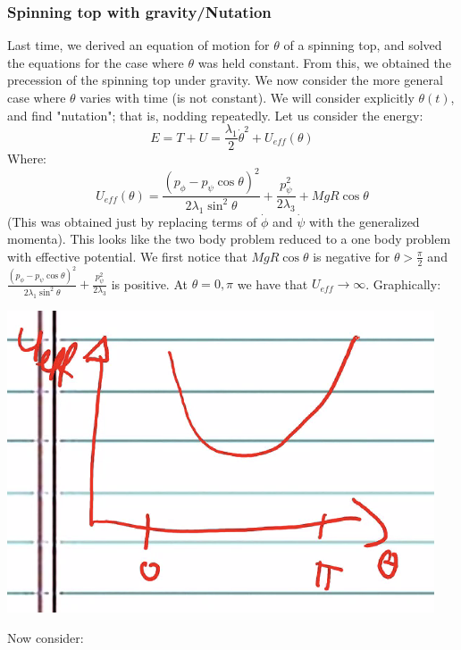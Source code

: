 \documentclass[../PHYS306Notes.tex]{subfiles}
\begin{document}
\subsubsection{Spinning top with gravity/Nutation}
Last time, we derived an equation of motion for $\theta$ of a spinning top, and solved the equations for the case where $\theta$ was held constant. From this, we obtained the precession of the spinning top under gravity. We now consider the more general case where $\theta$ varies with time (is not constant). We will consider explicitly $\theta(t)$, and find "nutation"; that is, nodding repeatedly. Let us consider the energy:
\[E = T + U = \frac{\lambda_1}{2}\dot{\theta}^2 + U_{eff}(\theta)\]
Where:
\[U_{eff}(\theta) = \frac{(p_\phi - p_\psi\cos\theta)^2}{2\lambda_1\sin^2\theta} + \frac{p_\psi^2}{2\lambda_3} + MgR\cos\theta\]
(This was obtained just by replacing terms of $\dot{\phi}$ and $\dot{\psi}$ with the generalized momenta). This looks like the two body problem reduced to a one body problem with effective potential. We first notice that $MgR\cos\theta$ is negative for $\theta > \frac{\pi}{2}$ and $\frac{(p_\phi - p_\psi\cos\theta)^2}{2\lambda_1\sin^2\theta} + \frac{p_\psi^2}{2\lambda_3}$ is positive. At $\theta = 0, \pi$ we have that $U_{eff} \rightarrow \infty$. Graphically:
\begin{center}
    \includegraphics[scale=0.5]{Lecture-22/l22-img1.png}
\end{center}
Now consider:
\end{document}
